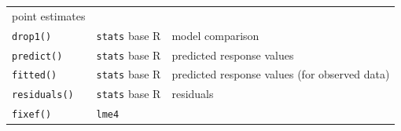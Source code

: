 \documentclass[
]{book}
\begin{document}
\begin{longtable}[]{@{}lll@{}}
\begin{minipage}[t]{0.59\columnwidth}
point estimates\strut
\end{minipage}\tabularnewline
\begin{minipage}[t]{0.16\columnwidth}\raggedright
\texttt{drop1()}\strut
\end{minipage} & \begin{minipage}[t]{0.17\columnwidth}\raggedright
\texttt{stats} base R\strut
\end{minipage} & \begin{minipage}[t]{0.59\columnwidth}\raggedright
model comparison\strut
\end{minipage}\tabularnewline
\begin{minipage}[t]{0.16\columnwidth}\raggedright
\texttt{predict()}\strut
\end{minipage} & \begin{minipage}[t]{0.17\columnwidth}\raggedright
\texttt{stats} base R\strut
\end{minipage} & \begin{minipage}[t]{0.59\columnwidth}\raggedright
predicted response values\strut
\end{minipage}\tabularnewline
\begin{minipage}[t]{0.16\columnwidth}\raggedright
\texttt{fitted()}\strut
\end{minipage} & \begin{minipage}[t]{0.17\columnwidth}\raggedright
\texttt{stats} base R\strut
\end{minipage} & \begin{minipage}[t]{0.59\columnwidth}\raggedright
predicted response values (for observed data)\strut
\end{minipage}\tabularnewline
\begin{minipage}[t]{0.16\columnwidth}\raggedright
\texttt{residuals()}\strut
\end{minipage} & \begin{minipage}[t]{0.17\columnwidth}\raggedright
\texttt{stats} base R\strut
\end{minipage} & \begin{minipage}[t]{0.59\columnwidth}\raggedright
residuals\strut
\end{minipage}\tabularnewline
\begin{minipage}[t]{0.16\columnwidth}\raggedright
\texttt{fixef()}\strut
\end{minipage} & \begin{minipage}[t]{0.17\columnwidth}\raggedright
\texttt{lme4}\strut
\end{minipage} & \begin{minipage}[t]{0.59\columnwidth}\raggedright

\end{minipage}
\end{longtable}
\end{document}
